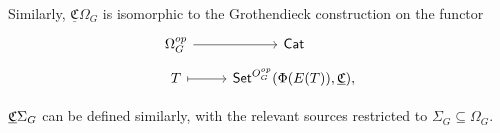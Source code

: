 \documentclass[a4paper,10pt
,draft
]{article}%
\begin{document}
\begin{remark}
      
      Similarly, $\underline{\mathfrak C}\Omega_G$ is isomorphic to the Grothendieck construction on the functor
      \begin{equation}
            \begin{tikzcd}[row sep = tiny]
                  \Omega_G^{op} \arrow[r]
                  &
                  \mathsf{Cat}
                  \\
                  T \arrow[r, mapsto]
                  &
                  \Set^{O_G^{op}}(\Phi(E(T)), \underline{\mathfrak C}),
            \end{tikzcd}
      \end{equation}
      
      $\underline{\mathfrak C} \Sigma_G$ can be defined similarly, with the relevant sources restricted to
      $\Sigma_G \subseteq \Omega_G$. 
\end{remark}
\end{document}
